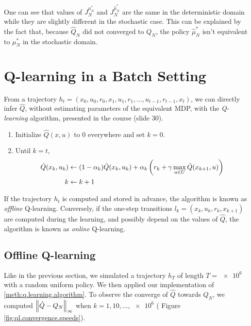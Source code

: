 \documentclass[a4paper, 12pt]{article}
\begin{document}
    One can see that values of $J^{\mu^*_N}_N$ and $J^{\hat{\mu}^*_N}_N$ are the same in the deterministic domain while they are slightly different in the stochastic case. This can be explained by the fact that, because $\hat{Q}_N$ did not converged to $Q_N$, the policy $\hat{\mu}^*_N$ isn't equivalent to $\mu^*_N$ in the stochastic domain.
    
    \section{Q-learning in a Batch Setting}
    
    From a trajectory $h_t = (x_0, u_0, r_0, x_1, u_1, r_1, \dots, u_{t-1}, r_{t-1}, x_t)$, we can directly infer $\hat{Q}$, without estimating parameters of the equivalent MDP, with the \emph{Q-learning} algorithm, presented in the course (slide 30).
    
    \begin{fmd-method}\label{meth:q.learning.algorithm}
        \begin{enumerate}
            \item Initialize $\hat{Q}(x, u)$ to $0$ everywhere and set $k = 0$.
            \item Until $k = t$,
            \begin{align*}
                \hat{Q}(x_k, u_k) & \leftarrow (1 - \alpha_k) \hat{Q}(x_k, u_k) + \alpha_k \left( r_k + \gamma \max_{u \in U} \hat{Q}(x_{k+1}, u) \right) \\
                k & \leftarrow k + 1
            \end{align*}
        \end{enumerate}
    \end{fmd-method}
    
    If the trajectory $h_t$ is computed and stored in advance, the algorithm is known as \emph{offline} Q-learning. Conversely, if the one-step transitions $l_k = (x_k, u_k, r_k, x_{k+1})$ are computed during the learning, and possibly depend on the values of $\hat{Q}$, the algorithm is known as \emph{online} Q-learning.
    
    \subsection{Offline Q-learning}
    
    Like in the previous section, we simulated a trajectory $h_T$ of length $T = \num{e6}$ with a random uniform policy. We then applied our implementation of \ref{meth:q.learning.algorithm}. To observe the converge of $\hat{Q}$ towards $Q_N$, we computed $\left\|\hat{Q} - Q_N\right\|_\infty$ when $k = 1, 10, \dots, \num{e6}$ (\cf{} Figure \ref{fig:ql.convergence.speeds}).
    
\end{document}
